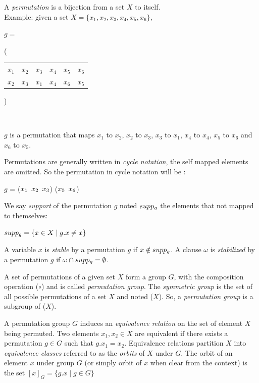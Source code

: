 A \emph{permutation} is a bijection from a set $X$ to itself.\\
Example: given a set $X = \{x_1, x_2, x_3, x_4, x_5, x_6\}$,
\begin{center}
$g = ${\Bigg( \begin{tabular}{cccccc}
		$x_1$ & $x_2$ & $x_3$ & $x_4$ & $x_5$ & $x_6$\\
		$x_2$ & $x_3$ & $x_1$ & $x_4$ & $x_6$ & $x_5$
	\end{tabular} \Bigg)}\\
\end{center}

$g$ is a permutation that maps $x_1$ to $x_2$, $x_2$ to $x_3$, $x_3$ to $x_1$, $x_4$ to $x_4$, $x_5$ to $x_6$ and $x_6$ to $x_5$.

Permutations are generally written in \emph{cycle notation}, the self mapped elements are omitted.
So the permutation in cycle notation will be : 
\begin{center}
	$g$ = ($x_1 \enskip x_2 \enskip x_3$) ($x_5 \enskip x_6$)
\end{center}

We say \emph{support} of the permutation $g$ noted $supp_{g}$ the elements that not mapped to themselves:
\begin{center}
	$supp_{g} = \{ x \in X \mid g.x \neq x\}$
\end{center}
A variable $x$ is \emph{stable} by a permutation $g$ 
if $x \notin supp_g$. A clause $\omega$ is \emph{stabilized} by a permutation $g$ if 
$\omega \cap supp_g = \emptyset$.


A set of permutations of a given set $X$ form a group $G$,
with the composition operation ($\circ$) and is called \emph{permutation group}.
The \emph{symmetric group} is the set of all possible permutations of a set $X$ and noted \Group($X$).
So, a \emph{permutation group} is a subgroup of \Group($X$). 


A permutation group $G$ induces an \emph{equivalence relation} on the set of element $X$ being
permuted. Two elements $x_1, x_2 \in X$ are equivalent if there exists a permutation $g \in G$ such that
$g.x_1 = x_2$. Equivalence relations partition $X$ into \emph{equivalence classes} referred to
as the \emph{orbits} of $X$ under $G$. The orbit of an element $x$ under group $G$ (or simply orbit of $x$ when clear
from the context) is the set $[x]_G = \{g.x \mid g \in G\}$


